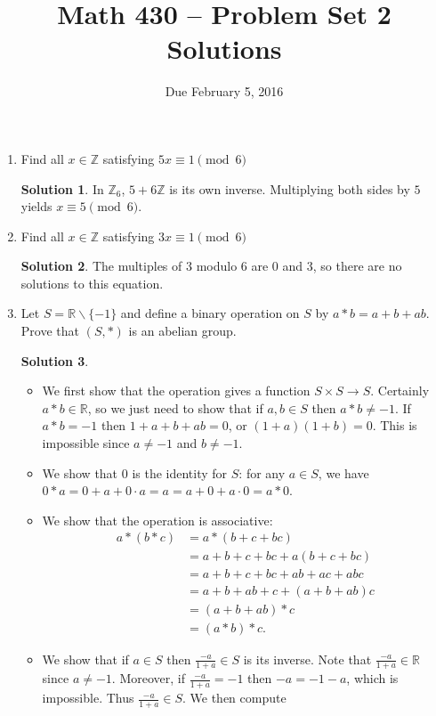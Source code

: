\documentclass{article}
\title{Math 430 -- Problem Set 2 Solutions}
\date{Due February 5, 2016}
\newcommand{\RR}{\mathbb{R}}
\newcommand{\ZZ}{\mathbb{Z}}
\theoremstyle{definition}
\newtheorem*{solution}{Solution}
\begin{document}
\maketitle


\begin{enumerate}

\item[3.1(e).] Find all $x \in \ZZ$ satisfying $5x \equiv 1 \pmod{6}$
\begin{solution}
In $\ZZ_6$, $5 + 6\ZZ$ is its own inverse.  Multiplying both sides by $5$ yields $x \equiv 5 \pmod{6}$.
\end{solution}
\item[3.1(f).] Find all $x \in \ZZ$ satisfying $3x \equiv 1 \pmod{6}$
\begin{solution}
The multiples of $3$ modulo $6$ are $0$ and $3$, so there are no solutions to this equation.
\end{solution}
\item[3.7.] Let $S = \RR \backslash \{-1\}$ and define a binary operation on $S$ by $a * b = a + b + ab$.  Prove that $(S, *)$ is an abelian group.
\begin{solution} $ $
\begin{itemize}
\item We first show that the operation gives a function $S \times S \to S$.  Certainly $a * b \in \RR$, so we just need to show that if $a,b \in S$ then $a*b \ne -1$.  If $a * b = -1$ then $1 + a + b + ab = 0$, or $(1+a)(1+b) = 0$.  This is impossible since $a \ne -1$ and $b \ne -1$.
\item We show that $0$ is the identity for $S$: for any $a \in S$, we have $0 * a = 0 + a + 0\cdot a = a = a + 0 + a \cdot 0 = a * 0$.
\item We show that the operation is associative:
\begin{align*}
a * (b * c) &= a*(b + c + bc) \\
&= a + b + c + bc + a(b + c + bc) \\
&= a + b + c + bc + ab + ac + abc \\
&= a + b + ab + c + (a + b + ab)c \\
&= (a + b + ab) * c\\
&= (a * b) * c.
\end{align*}
\item We show that if $a \in S$ then $\frac{-a}{1+a} \in S$ is its inverse.  Note that $\frac{-a}{1+a} \in \RR$ since $a \ne -1$.  Moreover, if $\frac{-a}{1+a} = -1$ then $-a = -1 - a$, which is impossible.  Thus $\frac{-a}{1+a} \in S$.  We then compute

\end{itemize}
\end{solution}
\end{enumerate}
\end{document}
